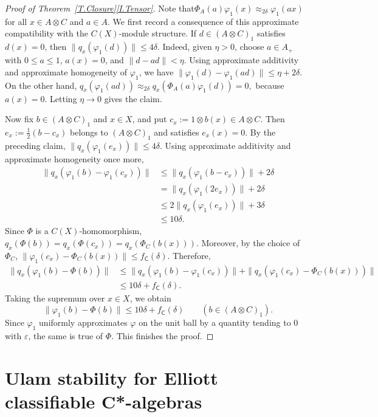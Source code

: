 \documentclass[11pt]{amsproc}
\newcommand{\cstar}{C*}
\newcommand{\sfC}{\mathsf C}
\theoremstyle{definition}
\theoremstyle{plain}
\theoremstyle{remark}
\begin{document}
\begin{proof}[Proof of Theorem~\ref{T.Closure}\eqref{I.Tensor}]
	Note that$\Phi_A(a)\varphi_1(x) \approx_{2\delta} \varphi_1(ax)$ for all $x \in A \otimes C$ and $a \in A$.
	We first record a consequence of this approximate compatibility with the $C(X)$-module structure.
	If $d\in (A\otimes C)_1$ satisfies $d(x)=0$, then
	$
		\|q_x(\varphi_1(d))\|\leq 4\delta.
	$
	Indeed, given $\eta>0$, choose $a\in A_+$ with
	$0\leq a\leq 1$, $a(x)=0$, and $\|d-ad\|<\eta$.
	Using approximate additivity and approximate homogeneity of
	$\varphi_1$, we have
	$
		\|\varphi_1(d)-\varphi_1(ad)\|
		\leq \eta+2\delta.
	$
	On the other hand,
	$
		q_x(\varphi_1(ad))
		\approx_{2\delta}q_x(\Phi_A(a)\varphi_1(d))=0,
	$
	because $a(x)=0$. Letting $\eta\to 0$ gives the claim.

	Now fix $b\in (A\otimes C)_1$ and $x\in X$, and put
	$
		c_x:=1\otimes b(x)\in A\otimes C.
	$
	Then $e_x:=\frac12(b-c_x)$ belongs to $(A\otimes C)_1$ and satisfies
	$e_x(x)=0$. By the preceding claim,
	$
		\|q_x(\varphi_1(e_x))\|\leq 4\delta.
	$
	Using approximate additivity and approximate homogeneity once more,
	\begin{align*}
		\|q_x(\varphi_1(b)-\varphi_1(c_x))\|
		&\leq \|q_x(\varphi_1(b-c_x))\|+2\delta\\
		&=\|q_x(\varphi_1(2e_x))\|+2\delta\\
		&\leq 2\|q_x(\varphi_1(e_x))\|+3\delta\\
		&\leq 10\delta.
	\end{align*}
	Since $\Phi$ is a $C(X)$-homomorphism,
	$
		q_x(\Phi(b))=q_x(\Phi(c_x))
		=q_x(\Phi_C(b(x))).
	$
	Moreover, by the choice of $\Phi_C$,
	$
		\|\varphi_1(c_x)-\Phi_C(b(x))\|
		\leq f_{\sfC}(\delta).
	$
	Therefore,
	\begin{align*}
		\|q_x(\varphi_1(b)-\Phi(b))\|
		&\leq
		\|q_x(\varphi_1(b)-\varphi_1(c_x))\|
		+\|q_x(\varphi_1(c_x)-\Phi_C(b(x)))\|\\
		&\leq 10\delta+f_{\sfC}(\delta).
	\end{align*}
	Taking the supremum over $x\in X$, we obtain
	\[
		\|\varphi_1(b)-\Phi(b)\|
		\leq 10\delta+f_{\sfC}(\delta)
		\qquad (b\in (A\otimes C)_1).
	\]
	Since $\varphi_1$ uniformly approximates $\varphi$ on the unit ball
	by a quantity tending to $0$ with $\varepsilon$, the same is true of
	$\Phi$. This finishes the proof.
\end{proof}

\section{Ulam stability for Elliott classifiable \cstar-algebras}
\label{S.Extensions}
\end{document}
